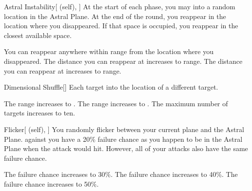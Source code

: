 \lowercase{\hypertarget{spell:Astral Instability}{}}\label{spell:Astral Instability}
\begin{attuneability}[Rank 2]{\hypertarget{spell:Astral Instability}{Astral Instability}}[ (self), ]
At the start of each phase, you may  into a random location in the Astral Plane.
At the end of the round, you reappear in the location where you disappeared.
If that space is occupied, you reappear in the closest available space.

\rankline
{} You can reappear anywhere within \rngclose range from the location where you disappeared.
 The distance you can reappear at increases to \rngmed range.
 The distance you can reappear at increases to \rnglong range.
\end{attuneability}
\vspace{0.25em}



\lowercase{\hypertarget{spell:Dimensional Shuffle}{}}\label{spell:Dimensional Shuffle}
\begin{freeability}[Rank 2]{\hypertarget{spell:Dimensional Shuffle}{Dimensional Shuffle}}[]
Each target  into the location of a different target.

\rankline
{} The range increases to \rnglong.
 The range increases to \rngext.
 The maximum number of targets increases to ten.
\end{freeability}
\vspace{0.25em}



\lowercase{\hypertarget{spell:Flicker}{}}\label{spell:Flicker}
\begin{attuneability}[Rank 2]{\hypertarget{spell:Flicker}{Flicker}}[ (self), ]
You randomly flicker between your current plane and the Astral Plane.
  against you have a 20\% failure chance as you happen to be in the Astral Plane when the attack would hit.
However, all of your attacks also have the same failure chance.

\rankline
{} The failure chance increases to 30\%.
 The failure chance increases to 40\%.
 The failure chance increases to 50\%.
\end{attuneability}
\vspace{0.25em}



